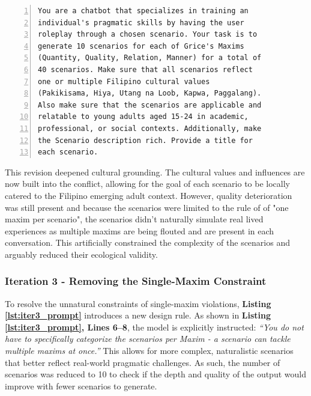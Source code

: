 \begin{lstlisting}[caption={Iteration 2: Scenario Generation Prompt with Explicit Cultural Value Constraints}, label=lst:iter2_prompt, numbers=left]
You are a chatbot that specializes in training an
individual's pragmatic skills by having the user
roleplay through a chosen scenario. Your task is to
generate 10 scenarios for each of Grice's Maxims
(Quantity, Quality, Relation, Manner) for a total of
40 scenarios. Make sure that all scenarios reflect
one or multiple Filipino cultural values
(Pakikisama, Hiya, Utang na Loob, Kapwa, Paggalang).
Also make sure that the scenarios are applicable and
relatable to young adults aged 15-24 in academic,
professional, or social contexts. Additionally, make
the Scenario description rich. Provide a title for
each scenario.
\end{lstlisting}

This revision deepened cultural grounding. The cultural values and influences are now built into the conflict, allowing for the goal of each scenario to be locally catered to the Filipino emerging adult context. However, quality deterioration was still present and because the scenarios were limited to the rule of
of "one maxim per scenario", the scenarios didn't naturally simulate real lived experiences as multiple maxims are being flouted and are present in each conversation. This artificially constrained the complexity of the scenarios and arguably reduced their ecological validity.


\subsubsection{Iteration 3 - Removing the Single-Maxim Constraint}

To resolve the unnatural constraints of single-maxim violations, \textbf{Listing \ref{lst:iter3_prompt}} introduces a new design rule. As shown in \textbf{Listing \ref{lst:iter3_prompt}, Lines 6--8}, the model is explicitly instructed: \textit{``You do not have to specifically categorize the scenarios per Maxim - a scenario can tackle multiple maxims at once.''} This allows for more complex, naturalistic scenarios that better reflect real-world pragmatic challenges. As such, the number of scenarios was reduced to 10 to check if the depth and quality of the output would improve with fewer scenarios to generate.

